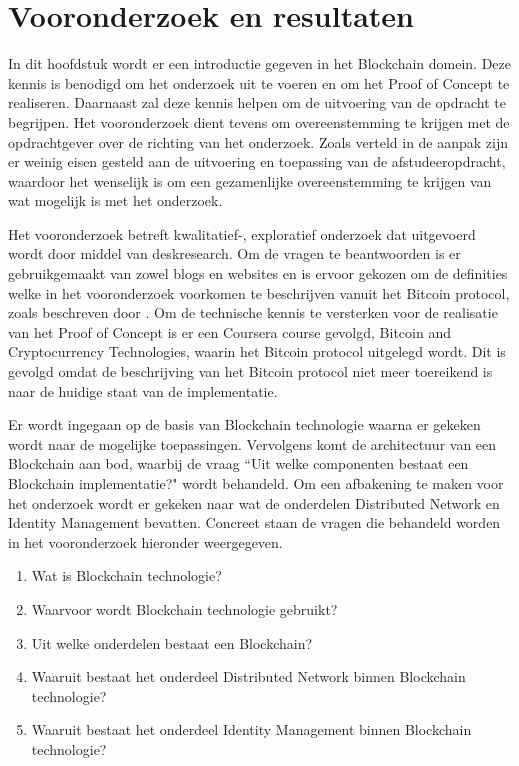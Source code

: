 \chapter{Vooronderzoek en resultaten}

In dit hoofdstuk wordt er een introductie gegeven in het Blockchain domein. Deze kennis is benodigd om het onderzoek uit te voeren en om het Proof of Concept te realiseren. Daarnaast zal deze kennis helpen om de uitvoering van de opdracht te begrijpen. Het vooronderzoek dient tevens om overeenstemming te krijgen met de opdrachtgever over de richting van het onderzoek. Zoals verteld in de aanpak zijn er weinig eisen gesteld aan de uitvoering en toepassing van de afstudeeropdracht, waardoor het wenselijk is om een gezamenlijke overeenstemming te krijgen van wat mogelijk is met het onderzoek. 

Het vooronderzoek betreft kwalitatief-, exploratief onderzoek dat uitgevoerd wordt door middel van deskresearch. Om de vragen te beantwoorden is er gebruikgemaakt van zowel blogs en websites en is ervoor gekozen om de definities welke in het vooronderzoek voorkomen te beschrijven vanuit het Bitcoin protocol, zoals beschreven door \cite{nakamoto2008bitcoin}. Om de technische kennis te versterken voor de realisatie van het Proof of Concept is er een Coursera course gevolgd, Bitcoin and Cryptocurrency Technologies, waarin het Bitcoin protocol uitgelegd wordt. Dit is gevolgd omdat de beschrijving van het Bitcoin protocol niet meer toereikend is naar de huidige staat van de implementatie.

Er wordt ingegaan op de basis van Blockchain technologie waarna er gekeken wordt naar de mogelijke toepassingen. Vervolgens komt de architectuur van een Blockchain aan bod, waarbij de vraag ``Uit welke componenten bestaat een Blockchain implementatie?" wordt behandeld. Om een afbakening te maken voor het onderzoek wordt er gekeken naar wat de onderdelen Distributed Network en Identity Management bevatten. Concreet staan de vragen die behandeld worden in het vooronderzoek hieronder weergegeven.

\begin{enumerate}[noitemsep]
  \item Wat is Blockchain technologie?
  \item Waarvoor wordt Blockchain technologie gebruikt?
  \item Uit welke onderdelen bestaat een Blockchain?
  \item Waaruit bestaat het onderdeel Distributed Network binnen Blockchain technologie?
  \item Waaruit bestaat het onderdeel Identity Management binnen Blockchain technologie?
\end{enumerate}

